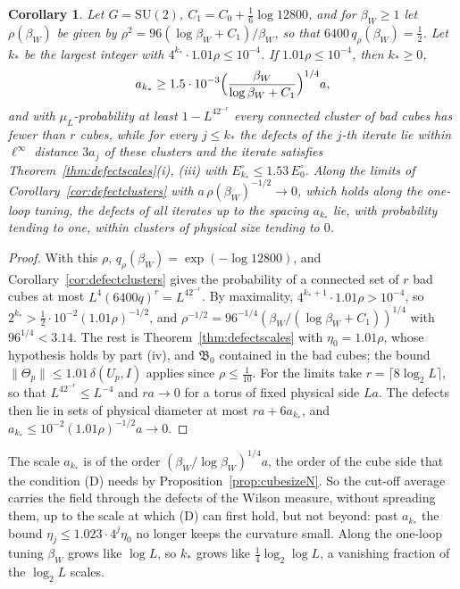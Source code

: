 \documentclass[11pt]{amsart}
\newtheorem{corollary}[theorem]{Corollary}
\theoremstyle{definition}
\theoremstyle{remark}
\numberwithin{equation}{section}
\newcommand{\SU}{\mathrm{SU}}
\begin{document}
\begin{corollary}\label{cor:defectscales}
Let $G=\SU(2)$, $C_1=C_0+\frac16\log12800$, and for $\beta_W\ge1$ let
$\rho(\beta_W)$ be given by $\rho^2=96(\log\beta_W+C_1)/\beta_W$, so that
$6400\,q_\rho(\beta_W)=\frac12$. Let $k_*$ be the largest integer with
$4^{k_*}\cdot1.01\rho\le10^{-4}$. If $1.01\rho\le10^{-4}$, then $k_*\ge0$,
\[
a_{k_*}\ge1.5\cdot10^{-3}\Bigl(\frac{\beta_W}{\log\beta_W+C_1}\Bigr)^{1/4}a,
\]
and with $\mu_L$-probability at least $1-L^42^{-r}$ every connected cluster
of bad cubes has fewer than $r$ cubes, while for every $j\le k_*$ the
defects of the $j$-th iterate lie within $\ell^\infty$ distance $3a_j$ of
these clusters and the iterate satisfies Theorem~\ref{thm:defectscales}(i),
(iii) with $E^\circ_{k_*}\le1.53\,E^\circ_0$. Along the limits of
Corollary~\ref{cor:defectclusters} with $a\,\rho(\beta_W)^{-1/2}\to0$, which
holds along the one-loop tuning, the defects of all iterates up to the
spacing $a_{k_*}$ lie, with probability tending to one, within clusters of
physical size tending to $0$.
\end{corollary}

\begin{proof}
With this $\rho$, $q_\rho(\beta_W)=\exp(-\log12800)$, and
Corollary~\ref{cor:defectclusters} gives the probability of a connected set
of $r$ bad cubes at most $L^4(6400q)^r=L^42^{-r}$. By maximality, $4^{k_*+1}
\cdot1.01\rho>10^{-4}$, so $2^{k_*}>\frac12\cdot10^{-2}(1.01\rho)^{-1/2}$,
and $\rho^{-1/2}=96^{-1/4}(\beta_W/(\log\beta_W+C_1))^{1/4}$ with $96^{1/4}
<3.14$. The rest is Theorem~\ref{thm:defectscales} with $\eta_0=1.01\rho$,
whose hypothesis holds by part (iv), and $\mathfrak B_0$ contained in the bad
cubes; the bound $\lVert\Theta_p\rVert\le1.01\,\delta(U_p,I)$ applies since
$\rho\le\frac1{10}$. For the limits take $r=\lceil8\log_2L\rceil$, so that
$L^42^{-r}\le L^{-4}$ and $ra\to0$ for a torus of fixed physical side $La$.
The defects then lie in sets of physical diameter at most $ra+6a_{k_*}$, and
$a_{k_*}\le10^{-2}(1.01\rho)^{-1/2}a\to0$.
\end{proof}

The scale $a_{k_*}$ is of the order $(\beta_W/\log\beta_W)^{1/4}a$, the
order of the cube side that the condition (D) needs by
Proposition~\ref{prop:cubesizeN}. So the cut-off average carries the field
through the defects of the Wilson measure, without spreading them, up to
the scale at which (D) can first hold, but not beyond: past $a_{k_*}$ the
bound $\eta_j\le1.023\cdot4^j\eta_0$ no longer keeps the curvature small.
Along the one-loop tuning $\beta_W$ grows like $\log L$, so $k_*$ grows like
$\frac14\log_2\log L$, a vanishing fraction of the $\log_2L$ scales.
\end{document}
